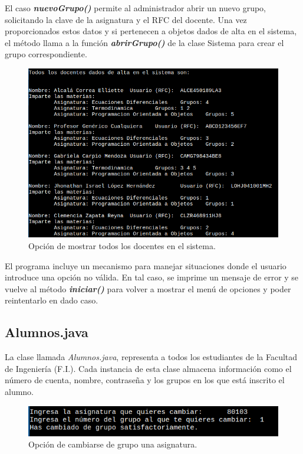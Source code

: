 \documentclass[a4paper,12pt]{article}
\begin{document}
El caso \textbf{\textit{nuevoGrupo()}} permite al administrador abrir un nuevo grupo, solicitando la clave de la asignatura y el RFC del docente. Una vez proporcionados estos datos y si pertenecen a objetos dados de alta en el sistema, el método llama a la función \textbf{\textit{abrirGrupo()}} de la clase Sistema para crear el grupo correspondiente.

\begin{figure}[ht]
    \centering
    \includegraphics[width=.9\textwidth]{media/docentes.png}
    \caption{Opción de mostrar todos los docentes en el sistema.}
    \label{fig:mostrar_docentes}
\end{figure}

El programa incluye un mecanismo para manejar situaciones donde el usuario introduce una opción no válida. En tal caso, se imprime un mensaje de error y se vuelve al método \textbf{\textit{iniciar()}} para volver a mostrar el menú de opciones y poder reintentarlo en dado caso.

\subsection{Alumnos.java}

La clase llamada \textit{Alumnos.java}, representa a todos los estudiantes de la Facultad de Ingeniería (F.I.). Cada instancia de esta clase almacena información como el número de cuenta, nombre, contraseña y los grupos en los que está inscrito el alumno.

\begin{figure}[ht]
    \centering
    \includegraphics[width=.9\textwidth]{media/cambiar_asignatura.png}
    \caption{Opción de cambiarse de grupo una asignatura.}
    \label{fig:cambiar_asig}
\end{figure}
\end{document}
